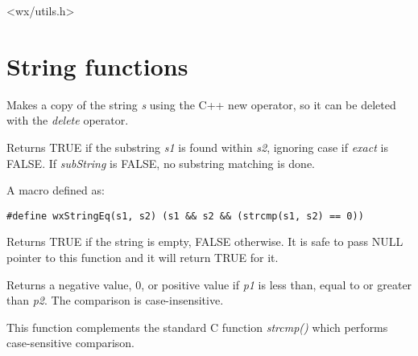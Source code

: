 


<wx/utils.h>

\section{String functions}



Makes a copy of the string {\it s} using the C++ new operator, so it can be
deleted with the {\it delete} operator.



Returns TRUE if the substring {\it s1} is found within {\it s2},
ignoring case if {\it exact} is FALSE. If {\it subString} is FALSE,
no substring matching is done.

\label{wxstringeq}


A macro defined as:

\begin{verbatim}
#define wxStringEq(s1, s2) (s1 && s2 && (strcmp(s1, s2) == 0))
\end{verbatim}

\label{isempty}


Returns TRUE if the string is empty, FALSE otherwise. It is safe to pass NULL
pointer to this function and it will return TRUE for it.

\label{stricmp}


Returns a negative value, 0, or positive value if {\it p1} is less than, equal
to or greater than {\it p2}. The comparison is case-insensitive.

This function complements the standard C function {\it strcmp()} which performs
case-sensitive comparison.

